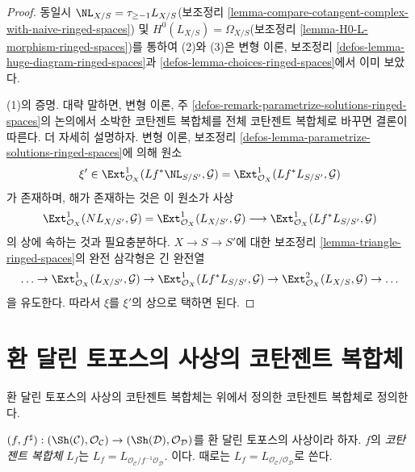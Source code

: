 \begin{proof}
동일시 $\NL_{X/S} = \tau_{\geq -1}L_{X/S}$(보조정리
\ref{lemma-compare-cotangent-complex-with-naive-ringed-spaces}) 및
$H^0(L_{X/S}) = \Omega_{X/S}$(보조정리
\ref{lemma-H0-L-morphism-ringed-spaces})를 통하여 (2)와 (3)은 변형 이론,
보조정리 \ref{defos-lemma-huge-diagram-ringed-spaces}과
\ref{defos-lemma-choices-ringed-spaces}에서 이미 보았다.

\medskip\noindent
(1)의 증명. 대략 말하면, 변형 이론, 주
\ref{defos-remark-parametrize-solutions-ringed-spaces}의 논의에서 소박한
코탄젠트 복합체를 전체 코탄젠트 복합체로 바꾸면 결론이 따른다. 더 자세히
설명하자. 변형 이론, 보조정리
\ref{defos-lemma-parametrize-solutions-ringed-spaces}에 의해 원소
$$
\xi' \in
\Ext^1_{\mathcal{O}_X}(Lf^*\NL_{S/S'}, \mathcal{G}) =
\Ext^1_{\mathcal{O}_X}(Lf^*L_{S/S'}, \mathcal{G})
$$
가 존재하며, 해가 존재하는 것은 이 원소가 사상
$$
\Ext^1_{\mathcal{O}_X}(NL_{X/S'}, \mathcal{G}) =
\Ext^1_{\mathcal{O}_X}(L_{X/S'}, \mathcal{G})
\longrightarrow
\Ext^1_{\mathcal{O}_X}(Lf^*L_{S/S'}, \mathcal{G})
$$
의 상에 속하는 것과 필요충분하다. $X \to S \to S'$에 대한 보조정리
\ref{lemma-triangle-ringed-spaces}의 완전 삼각형은 긴 완전열
$$
\ldots \to
\Ext^1_{\mathcal{O}_X}(L_{X/S'}, \mathcal{G}) \to
\Ext^1_{\mathcal{O}_X}(Lf^*L_{S/S'}, \mathcal{G}) \to
\Ext^2_{\mathcal{O}_X}(L_{X/S}, \mathcal{G}) \to \ldots
$$
을 유도한다. 따라서 $\xi$를 $\xi'$의 상으로 택하면 된다.
\end{proof}










\section{환 달린 토포스의 사상의 코탄젠트 복합체}
\label{section-cotangent-morphism-ringed-topoi}

\noindent
환 달린 토포스의 사상의 코탄젠트 복합체는 위에서 정의한 코탄젠트
복합체로 정의한다.

\begin{definition}
\label{definition-cotangent-complex-morphism-ringed-topoi}
$(f, f^\sharp) : (\Sh(\mathcal{C}), \mathcal{O}_\mathcal{C}) \to
(\Sh(\mathcal{D}), \mathcal{O}_\mathcal{D})$를 환 달린 토포스의 사상이라
하자. $f$의 {\it 코탄젠트 복합체} $L_f$는
$L_f = L_{\mathcal{O}_\mathcal{C}/f^{-1}\mathcal{O}_\mathcal{D}}$.
이다. 때로는 $L_f = L_{\mathcal{O}_\mathcal{C}/\mathcal{O}_\mathcal{D}}$로
쓴다.
\end{definition}

